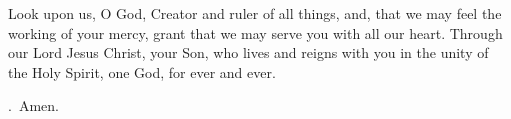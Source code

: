\lettrine[lines=3]{L}{}ook upon us, O God,
Creator and ruler of all things,
and, that we may feel the working of your mercy,
grant that we may serve you with all our heart.
Through our Lord Jesus Christ, your Son,
who lives and reigns with you in the unity of the Holy Spirit,
one God, for ever and ever. \par \Rbar.~Amen.
